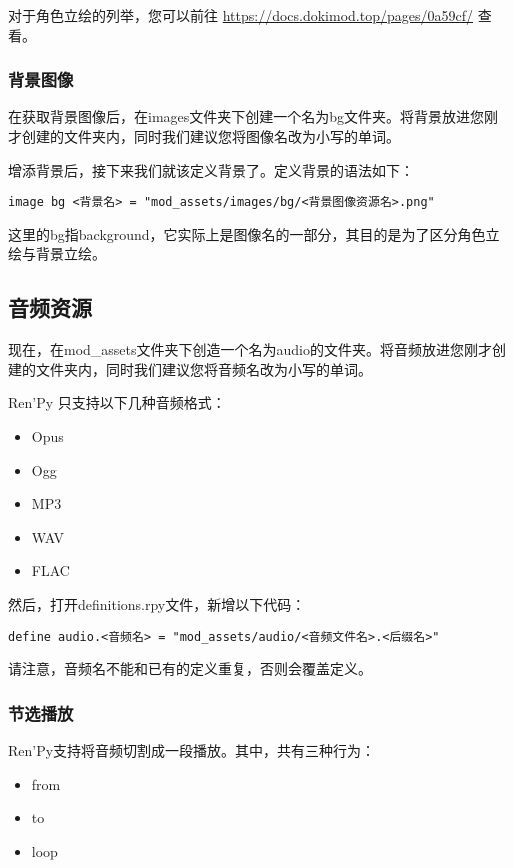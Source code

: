 对于角色立绘的列举，您可以前往 \url{https://docs.dokimod.top/pages/0a59cf/} 查看。

\subsubsection{背景图像}
在获取背景图像后，在images文件夹下创建一个名为bg文件夹。将背景放进您刚才创建的文件夹内，同时我们建议您将图像名改为小写的单词。

增添背景后，接下来我们就该定义背景了。定义背景的语法如下：

\begin{lstlisting}
image bg <背景名> = "mod_assets/images/bg/<背景图像资源名>.png"
\end{lstlisting}

\begin{ExtraKnowledge}
    这里的bg指background，它实际上是图像名的一部分，其目的是为了区分角色立绘与背景立绘。
\end{ExtraKnowledge}

\subsection{音频资源}
现在，在mod\_assets文件夹下创造一个名为audio的文件夹。将音频放进您刚才创建的文件夹内，同时我们建议您将音频名改为小写的单词。

\begin{Warning}
    Ren'Py 只支持以下几种音频格式：
    \begin{itemize}
        \item Opus
        \item Ogg
        \item MP3
        \item WAV
        \item FLAC
    \end{itemize}
\end{Warning}

然后，打开definitions.rpy文件，新增以下代码：
\begin{lstlisting}
define audio.<音频名> = "mod_assets/audio/<音频文件名>.<后缀名>"
\end{lstlisting}

请注意，音频名不能和已有的定义重复，否则会覆盖定义。

\subsubsection{节选播放}
Ren'Py支持将音频切割成一段播放。其中，共有三种行为：
\begin{itemize}
    \item from
    \item to
    \item loop
\end{itemize}

